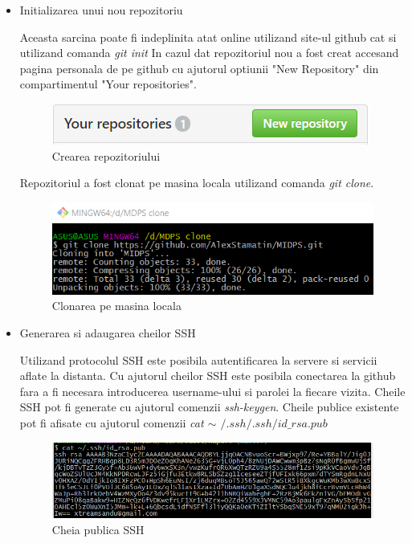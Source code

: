 \begin{itemize}
	\item Initializarea unui nou repozitoriu
		
		Aceasta sarcina poate fi indeplinita atat online utilizand site-ul github cat si utilizand comanda \textit{git init}
		In cazul dat repozitoriul nou a fost creat accesand pagina personala de pe github cu ajutorul optiunii "New Repository" din compartimentul "Your repositories".
		
		\begin{figure}[h]
			\centering
 			 \includegraphics[scale=0.75]{"task 1 create repo"}
 			 \caption{Crearea repozitoriului}
 			 \label{fig:create_repo}
		\end{figure}
\newpage
Repozitoriul a fost clonat pe masina locala utilizand comanda \textit{git clone}.

		\begin{figure}[h!]
			\centering
 			 \includegraphics[scale=0.75]{"task 1 cloning"}
 			 \caption{Clonarea pe masina locala}
 			 \label{fig:clone_repo}
		\end{figure}
		
\item Generarea si adaugarea cheilor SSH

Utilizand protocolul SSH este posibila autentificarea la servere si servicii aflate la distanta. Cu ajutorul cheilor SSH este posibila conectarea la github fara a fi necesara introducerea username-ului si parolei la fiecare vizita.
Cheile SSH pot fi generate cu ajutorul comenzii \textit{ssh-keygen}. Cheile publice existente pot fi afisate cu ajutorul comenzii \textit{cat $\sim$ $/.ssh/.ssh/id\_rsa.pub$}

	\begin{figure}[h!]
			\centering
 			 \includegraphics[scale=0.75]{"task 2 SSH"}
 			 \caption{Cheia publica SSH}
 			 \label{fig:clone_repo}
		\end{figure}


\end{itemize}

